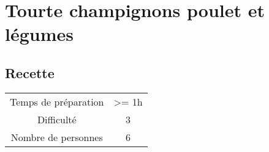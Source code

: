 \newpage
\section{Tourte champignons poulet et légumes}
    \label{sec:Tourte champignons poulet et légumes}
    \subsection{Recette}
    \vspace{1cm}


    \begin{center}
        \begin{tabular}{c|c}
            Temps de préparation & >= 1h \\
            Difficulté & 3 \\
            Nombre de personnes & 6 
        \end{tabular}
    \end{center}{}

    \vspace{1cm}
    \hline
    \vspace{1cm}

